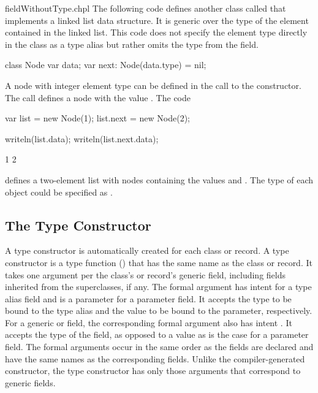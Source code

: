 \begin{chapelexample}{fieldWithoutType.chpl}
The following code defines another class called  that
implements a linked list data structure.  It is generic over the type
of the element contained in the linked list.  This code does not
specify the element type directly in the class as a type alias but
rather omits the type from the  field.
\begin{chapel}
class Node {
  var data;
  var next: Node(data.type) = nil;
}
\end{chapel}
A node with integer element type can be defined in the call to the
constructor.  The call  defines a node with the
value .  The code
\begin{chapel}
var list = new Node(1);
list.next = new Node(2);
\end{chapel}
\begin{chapelpost}
writeln(list.data);
writeln(list.next.data);
\end{chapelpost}
\begin{chapeloutput}
1
2
\end{chapeloutput}
defines a two-element list with nodes containing the values 
and .  The type of each object could be specified
as .
\end{chapelexample}

\subsection{The Type Constructor}
\label{Type_Constructors}

A type constructor is automatically created for each class or record.
A type constructor is a type function () that has
the same name as the class or record.  It takes one argument per the
class's or record's generic field, including fields inherited from the
superclasses, if any.
The formal argument has intent  for a type alias field and is a
parameter for a parameter field. It accepts the type to be bound
to the type alias and the value to be bound to the parameter, respectively.
For a generic  or  field, the corresponding
formal argument also has intent . It accepts the type
of the field, as opposed to a value as is the case for a parameter field.
The formal arguments occur in the same order as the fields are
declared and have the same names as the corresponding fields.
Unlike the compiler-generated constructor, the type constructor has only
those arguments that correspond to generic fields.

